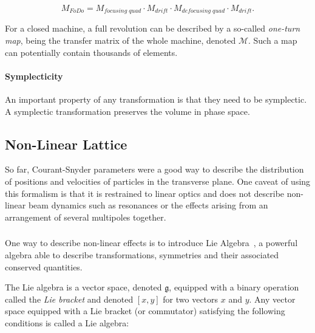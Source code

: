 \begin{equation}
    M_{FoDo} = M_{focusing\;quad} \cdot M_{drift} \cdot M_{defocusing\;quad} \cdot M_{drift}.
\end{equation}

For a closed machine, a full revolution can be described by a so-called \textit{one-turn map}, being
the transfer matrix of the whole machine, denoted $\mathcal{M}$. Such a map can potentially contain
thousands of elements.


\paragraph{Symplecticity}

An important property of any transformation is that they need to be symplectic. A symplectic
transformation preserves the volume in phase space.


\subsection{Non-Linear Lattice}

So far, Courant-Snyder parameters were a good way to describe the distribution of positions and
velocities of particles in the transverse plane. One caveat of using this formalism is that it is 
restrained to linear optics and does not describe non-linear beam dynamics such as resonances or 
the effects arising from an arrangement of several multipoles together.

\subsubsection{}

One way to describe non-linear effects is to introduce Lie Algebra~\cite{dragt_overview_2013}, a
powerful algebra able to describe transformations, symmetries and their associated conserved
quantities. 

The Lie algebra is a vector space, denoted $\mathfrak{g}$, equipped with a binary operation called
the \textit{Lie bracket} and denoted $[x, y]$ for two vectors $x$ and $y$. Any vector space equipped
with a Lie bracket (or commutator) satisfying the following conditions is called a Lie
algebra:

